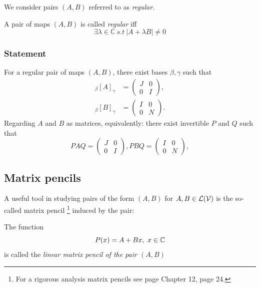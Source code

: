 We consider pairs $(A,B)$ referred to as \textit{regular}.

\begin{definition}
    A pair of maps $(A,B)$ is called \textit{regular} iff
    \begin{equation}\label{pencil}
        \exists \lambda\in \mathbb{C}\ s.t\ |A+\lambda B|\neq0
    \end{equation}
\end{definition}

\subsubsection{Statement}
For a regular pair of maps $(A,B)$, there exist bases $\beta,\gamma$ such that
\begin{equation}\label{weierstrass}
\begin{aligned}
{}_{\beta}[A]_{\gamma}
&=
\begin{pmatrix}
J & 0\\
0 & I
\end{pmatrix},
\\[1em]
{}_{\beta}[B]_{\gamma}
&=
\begin{pmatrix}
I & 0\\
0 & N
\end{pmatrix}.
\end{aligned}
\end{equation}
Regarding $A$ and $B$ as matrices, equivalently: there exist invertible $P$ and $Q$ such that
\begin{equation}
PAQ=
\begin{pmatrix}
J & 0\\
0 & I
\end{pmatrix},
PBQ=
\begin{pmatrix}
I & 0\\
0 & N
\end{pmatrix},
\end{equation}




\subsection{Matrix pencils}
A useful tool in studying pairs of the form \((A, B)\) for \(A, B \in \mathcal{L}(\mathcal{V}) \) is the so-called matrix pencil \footnote{For a rigorous analysis matrix pencils see \cite{gantmacher2026theory} page Chapter 12, page 24.} induced by the pair:

\begin{definition}
    The function \[P(x) = A+Bx,  \ x \in \mathbb{C} \]
    is called the \textit{linear matrix pencil of the pair $(A,B)$}
\end{definition}



